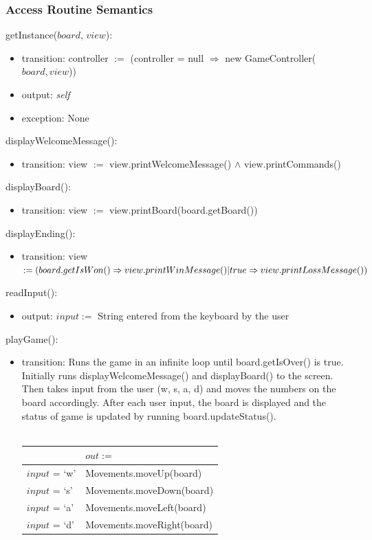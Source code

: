 \documentclass[12pt]{article}
\begin{document}
\subsubsection* {Access Routine Semantics}
getInstance($board$, $view$):
\begin{itemize}
  \item transition: controller $:=$ (controller = null $\Rightarrow$ new GameController($board, view$))
  \item output: \textit{self}
  \item exception: None
\end{itemize}

\noindent displayWelcomeMessage():
\begin{itemize}
  \item transition: view $:=$ view.printWelcomeMessage() $\wedge$ view.printCommands()
\end{itemize}

\noindent displayBoard():
\begin{itemize}
  \item transition: view $:=$ view.printBoard(board.getBoard())
\end{itemize}

\noindent displayEnding():
\begin{itemize}
  \item transition: view $:= (board.getIsWon() \Rightarrow view.printWinMessage() | \\ true \Rightarrow view.printLossMessage())$
\end{itemize}

\noindent readInput():
\begin{itemize}
  \item output: $input :=$ String entered from the keyboard by the user 
\end{itemize}

\noindent playGame():
\begin{itemize}
  \item transition: Runs the game in an infinite loop until board.getIsOver() is true. Initially runs displayWelcomeMessage() and displayBoard() to the screen. Then takes input from the user (w, s, a, d) and moves the numbers on the board accordingly. After each user input, the board is displayed and the status of game is updated by running board.updateStatus(). \\\\
  \begin{tabular}{| l | l |}
          \hline
          ~ & $out :=$ \\
          \hline
          $input$ = `w' & Movements.moveUp(board) \\
           \hline
          $input$ = `s' & Movements.moveDown(board) \\
           \hline
          $input$ = `a' & Movements.moveLeft(board) \\
           \hline
          $input$ = `d' & Movements.moveRight(board) \\
           \hline
        \end{tabular}
\end{itemize}
\end{document}
